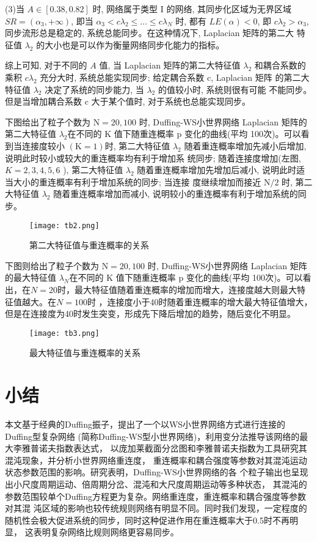 (3)当 $A \in[0.38,0.82]$ 时, 网络属于类型 $\mathrm{I}$ 的网络, 其同步化区域为无界区域 $S R=\left(\alpha_3,+\infty\right)$,
即当 $\alpha_3<c \lambda_2 \leq \ldots \leq c \lambda_N$ 时, 都有 $L E(\alpha)<0$, 即 $c \lambda_2>\alpha_3$,
同步流形总是稳定的, 系统总能同步。在这种情况下, Laplacian 矩阵的第二大 特征值 $\lambda_2$ 的大小也是可以作为衡量网络同步化能力的指标。\par

综上可知, 对于不同的 $A$ 值, 当 Laplacian 矩阵的第二大特征值 $\lambda_2$ 和耦合系数的乘积 $c \lambda_2$ 充分大时,
系统总能实现同步; 给定耦合系数 $\mathrm{c}$, Laplacian 矩阵 的第二大特征值 $\lambda_2$ 决定了系统的同步能力,
当 $\lambda_2$ 的值较小时, 系统则很有可能 不能同步。但是当增加耦合系数 $\mathrm{c}$ 大于某个值时, 对于系统也总能实现同步。

下图给出了粒子个数为 $\mathrm{N}=20,100$ 时, Duffing-WS小世界网络 Laplacian 矩阵的第二大特征值 $\lambda_2$在不同的 $\mathrm{K}$ 值下随重连概率 $\mathrm{p}$
变化的曲线(平均 100次)。可以看到当连接度较小 $(\mathrm{K}=1)$时, 第二大特征值 $\lambda_2$ 随着重连概率增加先减小后增加,
说明此时较小或较大的重连概率均有利于增加系 统同步; 随着连接度增加(左图, $K=2,3,4,5,6$ ), 第二大特征值 $\lambda_2$
随着重连概率增加先增加后减小, 说明此时适当大小的重连概率有利于增加系统的同步; 当连接 度继续增加而接近 $\mathrm{N} / 2$ 时,
第二大特征值 $\lambda_2$ 随着重连概率增加而减小, 说明较小的重连概率有利于增加系统的同步。\par
\begin{figure}[!htbp]
    \centering
    \texttt{[image: tb2.png]}
    \caption{第二大特征值与重连概率的关系}
\end{figure}
下图则给出了粒子个数为 $\mathrm{N}=20,100$ 时, Duffing-WS小世界网络 Laplacian 矩阵的最大特征值 $\lambda_N$在不同的 $\mathrm{K}$ 值下随重连概率 $\mathrm{p}$
变化的曲线(平均 100次)。可以看出，在$N=20$时，最大特征值随着重连概率的增加而增大，连接度越大则最大特征值越大。在$N=100$时
，连接度小于40时随着重连概率的增大最大特征值增大，但是在连接度为40时发生突变，形成先下降后增加的趋势，随后变化不明显。
\begin{figure}[!htbp]
    \centering
    \texttt{[image: tb3.png]}
    \caption{最大特征值与重连概率的关系}
\end{figure}
\section{小结} 
本文基于经典的Duffing振子，提出了一个以WS小世界网络方式进行连接的Duffing型复杂网络
(简称Duffing-WS型小世界网络)，利用变分法推导该网络的最大李雅普诺夫指数表达式，
以庞加莱截面分岔图和李雅普诺夫指数为工具研究其混沌现象，并分析小世界网络重连度，
重连概率和耦合强度等参数对其混沌运动状态参数范围的影响。研究表明，Duffing-WS小世界网络的各
个粒子输出也呈现出小尺度周期运动、倍周期分岔、混沌和大尺度周期运动等多种状态，
其混沌的参数范围较单个Duffing方程更为复杂。网络重连度，重连概率和耦合强度等参数对其混
沌区域的影响也较传统规则网络有明显不同。同时我们发现，一定程度的随机性会极大促进系统的同步，同时这种促进作用在重连概率大于0.5时不再明显，
这表明复杂网络比规则网络更容易同步。